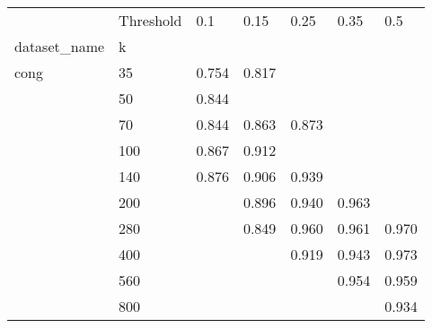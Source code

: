 \begin{tabular}{lllllll}
\toprule
     & Threshold &    0.1 &   0.15 &   0.25 &   0.35 &    0.5 \\
dataset_name & k &        &        &        &        &        \\
\midrule
cong & 35  &  0.754 &  0.817 &        &        &        \\
     & 50  &  0.844 &        &        &        &        \\
     & 70  &  0.844 &  0.863 &  0.873 &        &        \\
     & 100 &  0.867 &  0.912 &        &        &        \\
     & 140 &  0.876 &  0.906 &  0.939 &        &        \\
     & 200 &        &  0.896 &  0.940 &  0.963 &        \\
     & 280 &        &  0.849 &  0.960 &  0.961 &  0.970 \\
     & 400 &        &        &  0.919 &  0.943 &  0.973 \\
     & 560 &        &        &        &  0.954 &  0.959 \\
     & 800 &        &        &        &        &  0.934 \\
\bottomrule
\end{tabular}
